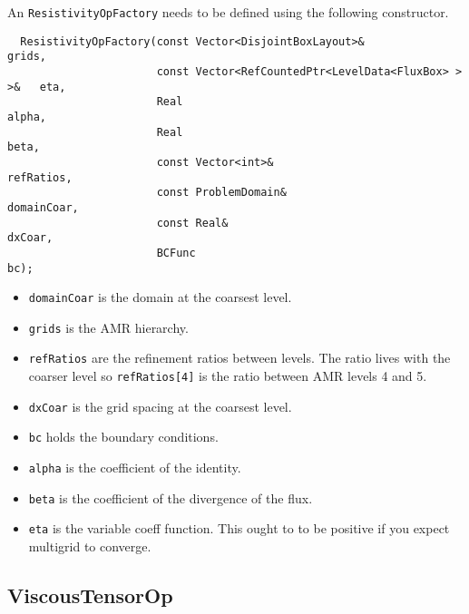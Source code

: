 An {\tt ResistivityOpFactory} needs to be defined using the following 
constructor.
\begin{verbatim}
  ResistivityOpFactory(const Vector<DisjointBoxLayout>&                     grids,
                       const Vector<RefCountedPtr<LevelData<FluxBox> > >&   eta,
                       Real                                                 alpha, 
                       Real                                                 beta,
                       const Vector<int>&                                   refRatios,
                       const ProblemDomain&                                 domainCoar,
                       const Real&                                          dxCoar,
                       BCFunc                                               bc);
\end{verbatim}
\begin{itemize}
  \item  {\tt  domainCoar} is the domain at the coarsest level.
  \item  {\tt  grids} is the AMR  hierarchy.
  \item  {\tt  refRatios} are the refinement ratios between levels.
    The ratio lives with the coarser level    so {\tt refRatios[4]} is
    the ratio between  AMR levels 4 and 5.
  \item  {\tt  dxCoar} is the grid spacing at the coarsest level.
  \item {\tt bc} holds the boundary conditions.
  \item {\tt alpha} is the coefficient of the identity.
  \item {\tt beta} is the coefficient of the divergence of the flux.
  \item {\tt eta} is the variable coeff function.  This ought to to be
  positive if you expect multigrid to converge.
\end{itemize}

\subsection{ViscousTensorOp}


